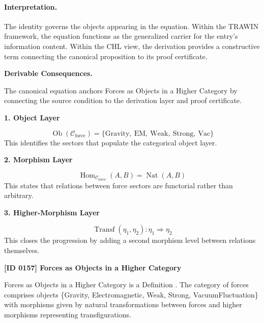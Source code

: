 \paragraph{Interpretation.}
The identity governs the objects appearing in the equation. Within the TRAWIN framework, the equation functions as the generalized carrier for the entry’s information content. Within the CHL view, the derivation provides a constructive term connecting the canonical proposition to its proof certificate.

\par\vspace{0.35em}
\noindent\textbf{Derivable Consequences.}\quad
\begingroup
\footnotesize
\raggedright
The canonical equation anchors Forces as Objects in a Higher Category by connecting the source condition to the derivation layer and proof certificate.
\par\endgroup

\noindent\textbf{1. Object Layer}\par
\[
\operatorname{Ob}(\mathcal{C}_{\mathrm{force}})
=
\{\mathrm{Gravity},\ \mathrm{EM},\ \mathrm{Weak},\ \mathrm{Strong},\ \mathrm{Vac}\}
\]
\noindent This identifies the sectors that populate the categorical object layer.\par
\noindent\textbf{2. Morphism Layer}\par
\[
\operatorname{Hom}_{\mathcal{C}_{\mathrm{force}}}(A,B)
=
\operatorname{Nat}(A,B)
\]
\noindent This states that relations between force sectors are functorial rather than arbitrary.\par
\noindent\textbf{3. Higher-Morphism Layer}\par
\[
\operatorname{Transf}(\eta_1,\eta_2)
:\eta_1\Rightarrow \eta_2
\]
\noindent This closes the progression by adding a second morphism level between relations themselves.\par

\clearpage
\noindent\textbf{[ID 0157] Forces as Objects in a Higher Category}\par
\vspace{0.35em}
\begingroup\small
{}
Forces as Objects in a Higher Category is a Definition  . The category of forces comprises objects \{Gravity, Electromagnetic, Weak, Strong, VacuumFluctuation\} with morphisms given by natural transformations between forces and higher morphisms representing transfigurations.  

